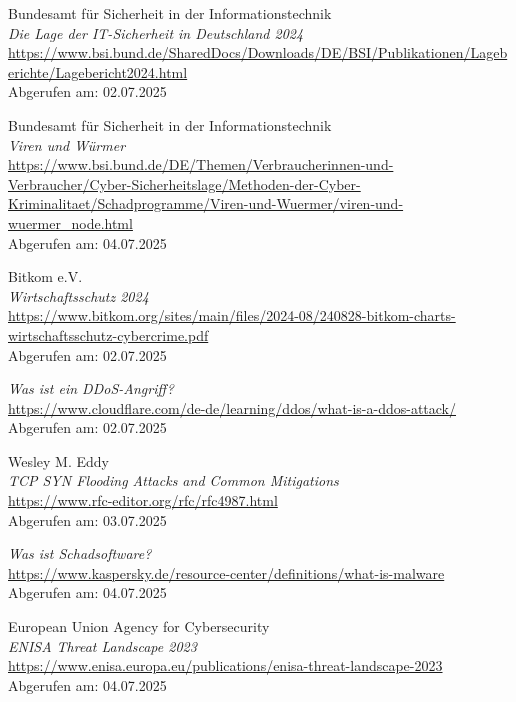 \documentclass[12pt]{scrreprt}
\begin{document}
	\newpage
	\begin{thebibliography}{99} %
		
Bundesamt für Sicherheit in der Informationstechnik\\
\emph{Die Lage der IT-Sicherheit in Deutschland 2024} \\
\url{https://www.bsi.bund.de/SharedDocs/Downloads/DE/BSI/Publikationen/Lageberichte/Lagebericht2024.html}\\
Abgerufen am: 02.07.2025
		
Bundesamt für Sicherheit in der Informationstechnik\\
\emph{Viren und Würmer} \\
\url{https://www.bsi.bund.de/DE/Themen/Verbraucherinnen-und-Verbraucher/Cyber-Sicherheitslage/Methoden-der-Cyber-Kriminalitaet/Schadprogramme/Viren-und-Wuermer/viren-und-wuermer_node.html}\\
Abgerufen am: 04.07.2025
	
Bitkom e.V.\\
\emph{Wirtschaftsschutz 2024} \\
\url{https://www.bitkom.org/sites/main/files/2024-08/240828-bitkom-charts-wirtschaftsschutz-cybercrime.pdf}\\
Abgerufen am: 02.07.2025

\emph{Was ist ein DDoS-Angriff?} \\
\url{https://www.cloudflare.com/de-de/learning/ddos/what-is-a-ddos-attack/} \\
Abgerufen am: 02.07.2025

Wesley M. Eddy\\
\emph{TCP SYN Flooding Attacks and Common Mitigations} \\
\url{https://www.rfc-editor.org/rfc/rfc4987.html} \\
Abgerufen am: 03.07.2025

\emph{Was ist Schadsoftware?} \\
\url{https://www.kaspersky.de/resource-center/definitions/what-is-malware}\\
Abgerufen am: 04.07.2025

European Union Agency for Cybersecurity\\
\emph{ENISA Threat Landscape 2023} \\
\url{https://www.enisa.europa.eu/publications/enisa-threat-landscape-2023}\\
Abgerufen am: 04.07.2025


\end{thebibliography}
\end{document}
